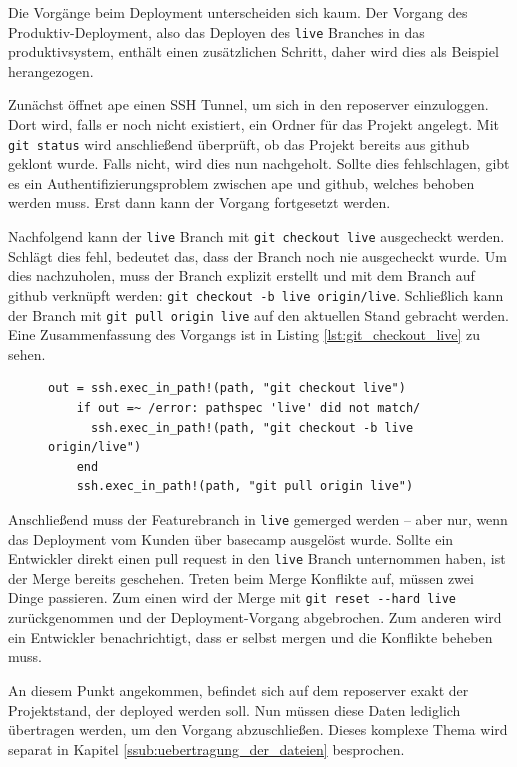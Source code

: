 Die Vorgänge beim Deployment unterscheiden sich kaum. Der Vorgang des Produktiv-Deployment, also das Deployen des \lstinline!live! Branches in das \gls{produktivsystem}, enthält einen zusätzlichen Schritt, daher wird dies als Beispiel herangezogen.

Zunächst öffnet \gls{ape} einen SSH Tunnel, um sich in den \gls{reposerver} einzuloggen. Dort wird, falls er noch nicht existiert, ein Ordner für das Projekt angelegt. Mit \lstinline!git status! wird anschließend überprüft, ob das Projekt bereits aus \gls{github} geklont wurde. Falls nicht, wird dies nun nachgeholt. Sollte dies fehlschlagen, gibt es ein Authentifizierungsproblem zwischen \gls{ape} und \gls{github}, welches behoben werden muss. Erst dann kann der Vorgang fortgesetzt werden.

Nachfolgend kann der \lstinline!live! Branch mit \lstinline!git checkout live! ausgecheckt werden. Schlägt dies fehl, bedeutet das, dass der Branch noch nie ausgecheckt wurde. Um dies nachzuholen, muss der Branch explizit erstellt und mit dem Branch auf \gls{github} verknüpft werden: \lstinline!git checkout -b live origin/live!. Schließlich kann der Branch mit \lstinline!git pull origin live! auf den aktuellen Stand gebracht werden. Eine Zusammenfassung des Vorgangs ist in Listing \ref{lst:git_checkout_live} zu sehen.

\begin{figure}
	\begin{lstlisting}[caption=Wechsel auf den aktualisierten Deployment Branch,label={lst:git_checkout_live}]
	out = ssh.exec_in_path!(path, "git checkout live")
	if out =~ /error: pathspec 'live' did not match/
	  ssh.exec_in_path!(path, "git checkout -b live origin/live")
	end
	ssh.exec_in_path!(path, "git pull origin live")
	\end{lstlisting}
\end{figure}

Anschließend muss der Featurebranch in \lstinline!live! gemerged werden -- aber nur, wenn das Deployment vom Kunden über \gls{basecamp} ausgelöst wurde. Sollte ein Entwickler direkt einen \gls{pull request} in den \lstinline!live! Branch unternommen haben, ist der Merge bereits geschehen. Treten beim Merge Konflikte auf, müssen zwei Dinge passieren. Zum einen wird der Merge mit \lstinline!git reset --hard live! zurückgenommen und der Deployment-Vorgang abgebrochen. Zum anderen wird ein Entwickler benachrichtigt, dass er selbst mergen und die Konflikte beheben muss.

An diesem Punkt angekommen, befindet sich auf dem \gls{reposerver} exakt der Projektstand, der deployed werden soll. Nun müssen diese Daten lediglich übertragen werden, um den Vorgang abzuschließen. Dieses komplexe Thema wird separat in Kapitel \ref{ssub:uebertragung_der_dateien} besprochen.

